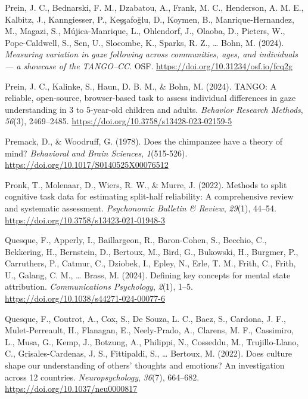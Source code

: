 \documentclass[
]{scrbook}
\newlength{\cslhangindent}
\newenvironment{CSLReferences}[2] %
 {\begin{list}{}{%
  \setlength{\itemindent}{0pt}
  \setlength{\leftmargin}{0pt}
  \setlength{\parsep}{0pt}
  \ifodd #1
   \setlength{\leftmargin}{\cslhangindent}
   \setlength{\itemindent}{-1\cslhangindent}
  \fi
  \setlength{\itemsep}{#2\baselineskip}}}
 {\end{list}}
\begin{document}
\begin{CSLReferences}{1}{0}
Prein, J. C., Bednarski, F. M., Dzabatou, A., Frank, M. C., Henderson, A. M. E., Kalbitz, J., Kanngiesser, P., Keşşafoğlu, D., Koymen, B., Manrique-Hernandez, M., Magazi, S., Mújica-Manrique, L., Ohlendorf, J., Olaoba, D., Pieters, W., Pope-Caldwell, S., Sen, U., Slocombe, K., Sparks, R. Z., \ldots{} Bohn, M. (2024). \emph{Measuring variation in gaze following across communities, ages, and individuals --- a showcase of the {TANGO}--{CC}}. OSF. \url{https://doi.org/10.31234/osf.io/fcq2g}

Prein, J. C., Kalinke, S., Haun, D. B. M., \& Bohn, M. (2024). {TANGO}: {A} reliable, open-source, browser-based task to assess individual differences in gaze understanding in 3 to 5-year-old children and adults. \emph{Behavior Research Methods}, \emph{56}(3), 2469--2485. \url{https://doi.org/10.3758/s13428-023-02159-5}

Premack, D., \& Woodruff, G. (1978). Does the chimpanzee have a theory of mind? \emph{Behavioral and Brain Sciences}, \emph{1}(515-526). \url{https://doi.org/10.1017/S0140525X00076512}

Pronk, T., Molenaar, D., Wiers, R. W., \& Murre, J. (2022). Methods to split cognitive task data for estimating split-half reliability: {A} comprehensive review and systematic assessment. \emph{Psychonomic Bulletin \& Review}, \emph{29}(1), 44--54. \url{https://doi.org/10.3758/s13423-021-01948-3}

Quesque, F., Apperly, I., Baillargeon, R., Baron-Cohen, S., Becchio, C., Bekkering, H., Bernstein, D., Bertoux, M., Bird, G., Bukowski, H., Burgmer, P., Carruthers, P., Catmur, C., Dziobek, I., Epley, N., Erle, T. M., Frith, C., Frith, U., Galang, C. M., \ldots{} Brass, M. (2024). Defining key concepts for mental state attribution. \emph{Communications Psychology}, \emph{2}(1), 1--5. \url{https://doi.org/10.1038/s44271-024-00077-6}

Quesque, F., Coutrot, A., Cox, S., De Souza, L. C., Baez, S., Cardona, J. F., Mulet-Perreault, H., Flanagan, E., Neely-Prado, A., Clarens, M. F., Cassimiro, L., Musa, G., Kemp, J., Botzung, A., Philippi, N., Cosseddu, M., Trujillo-Llano, C., Grisales-Cardenas, J. S., Fittipaldi, S., \ldots{} Bertoux, M. (2022). Does culture shape our understanding of others' thoughts and emotions? {An} investigation across 12 countries. \emph{Neuropsychology}, \emph{36}(7), 664--682. \url{https://doi.org/10.1037/neu0000817}


\end{CSLReferences}
\end{document}
